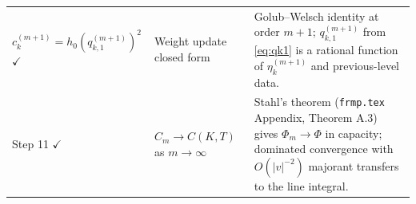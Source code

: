\documentclass{article}
\begin{document}
\begin{longtable}{@{}p{}p{}p{}@{}}
\addlinespace
%
$c_k^{(m+1)}=h_0(q_{k,1}^{(m+1)})^2$ $\checkmark$
  & Weight update closed form
  & Golub--Welsch identity at order $m+1$; $q_{k,1}^{(m+1)}$ from
    \eqref{eq:qk1} is a rational function of $\eta_k^{(m+1)}$
    and previous-level data. \\
\addlinespace
%
Step 11 $\checkmark$
  & $C_m\to C(K,T)$ as $m\to\infty$
  & Stahl's theorem (\texttt{frmp.tex} Appendix, Theorem A.3)
    gives $\Phi_m\to\Phi$ in capacity; dominated convergence
    with $O(|v|^{-2})$ majorant transfers to the line integral. \\
\end{longtable}
\endgroup
\end{document}
